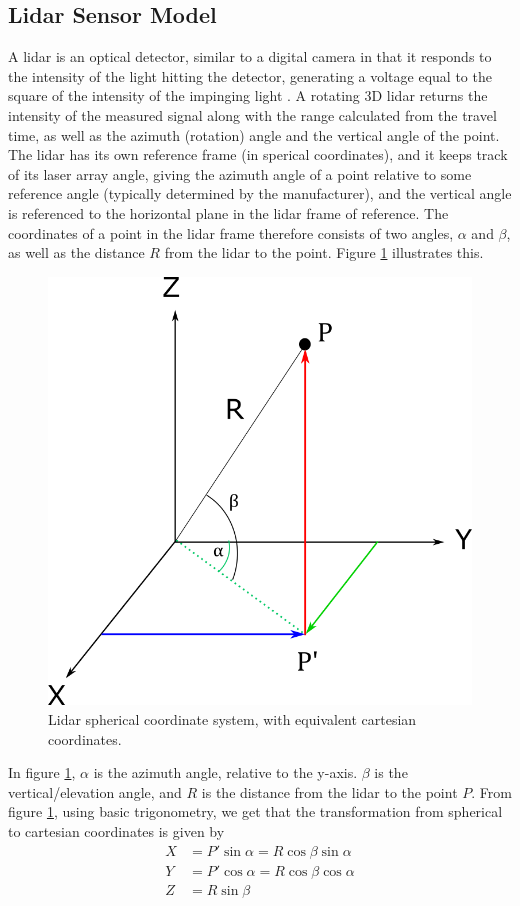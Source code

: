 \subsection{Lidar Sensor Model}
\label{section:lidar_model}
A lidar is an optical detector, similar to a digital camera in that it responds to the intensity of the light hitting the detector, generating a voltage equal to the square of the intensity of the impinging light \cite{SpieLidar}. A rotating 3D lidar returns the intensity of the measured signal along with the range calculated from the travel time, as well as the azimuth (rotation) angle and the vertical angle of the point. The lidar has its own reference frame (in sperical coordinates), and it keeps track of its laser array angle, giving the azimuth angle of a point relative to some reference angle (typically determined by the manufacturer), and the vertical angle is referenced to the horizontal plane in the lidar frame of reference. The coordinates of a point in the lidar frame therefore consists of two angles, $\alpha$ and $\beta$, as well as the distance $R$ from the lidar to the point. Figure \ref{fig:lidar_spherical} illustrates this.
\begin{figure}[H]
    \centering
    \includegraphics[width=.4\linewidth]{fig/sperical_to_cartesian.png}
    \caption{Lidar spherical coordinate system, with equivalent cartesian coordinates.}
    \label{fig:lidar_spherical}
\end{figure}
In figure \ref{fig:lidar_spherical}, $\alpha$ is the azimuth angle, relative to the y-axis. $\beta$ is the vertical/elevation angle, and $R$ is the distance from the lidar to the point $P$.
From figure \ref{fig:lidar_spherical}, using basic trigonometry, we get that the transformation from spherical to cartesian coordinates is given by
\begin{equation}
\label{eq:spheric_to_cartesian}
    \begin{split}
        X&=P'\sin{\alpha}=R\cos{\beta}\sin{\alpha}\\
        Y&=P'\cos{\alpha}=R\cos{\beta}\cos{\alpha}\\
        Z&=R\sin{\beta}
    \end{split}
\end{equation}
